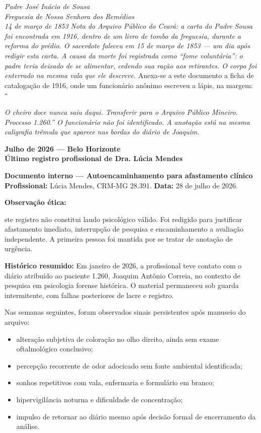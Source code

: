 \noindent \textit{Padre José Inácio de Sousa}\\
\noindent \textit{Freguesia de Nossa Senhora dos Remédios}\\
\noindent \textit{14 de março de 1853}
\noindent \textit{Nota do Arquivo Público do Ceará: a carta do Padre Sousa foi encontrada em 1916, dentro de um livro de tombo da freguesia, durante a reforma do prédio. O sacerdote faleceu em 15 de março de 1853 — um dia após redigir esta carta. A causa da morte foi registrada como \textquotedblleft{}fome voluntária\textquotedblright{}: o padre teria deixado de se alimentar, cedendo sua ração aos retirantes. O corpo foi enterrado na mesma vala que ele descreve.}
\noindent Anexa-se a este documento a ficha de catalogação de 1916, onde um funcionário anônimo escreveu a lápis, na margem: \textquotedblleft{\textit{O cheiro doce nunca saiu daqui. Transferir para o Arquivo Público Mineiro. Processo 1.260.\textquotedblright{} O funcionário não foi identificado. A anotação está na mesma caligrafia trêmula que aparece nas bordas do diário de Joaquim.}

\noindent \textbf{Julho de 2026 --- Belo Horizonte}\\
\noindent \textbf{Último registro profissional de Dra. Lúcia Mendes}

\noindent \textbf{Documento interno --- Autoencaminhamento para afastamento clínico}\\
\noindent \textbf{Profissional:} Lúcia Mendes, CRM-MG 28.391. \textbf{Data:} 28 de julho de 2026.

\noindent \textbf{Observação ética:}

\noindent ste registro não constitui laudo psicológico válido. Foi redigido para justificar afastamento imediato, interrupção de pesquisa e encaminhamento a avaliação independente. A primeira pessoa foi mantida por se tratar de anotação de urgência.

\noindent \textbf{Histórico resumido:}
\noindent Em janeiro de 2026, a profissional teve contato com o diário atribuído ao paciente 1.260, Joaquim Antônio Correia, no contexto de pesquisa em psicologia forense histórica. O material permaneceu sob guarda intermitente, com falhas posteriores de lacre e registro.

\noindent Nas semanas seguintes, foram observados sinais persistentes após manuseio do arquivo:

\begin{itemize}
\item alteração subjetiva de coloração no olho direito, ainda sem exame oftalmológico conclusivo;
\item percepção recorrente de odor adocicado sem fonte ambiental identificada;
\item sonhos repetitivos com vala, enfermaria e formulário em branco;
\item hipervigilância noturna e dificuldade de concentração;
\item impulso de retornar ao diário mesmo após decisão formal de encerramento da análise.
\end{itemize}

}
